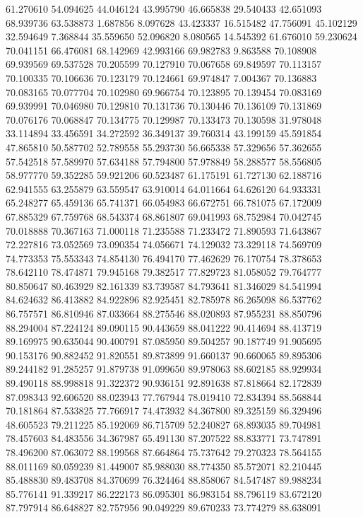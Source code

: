 61.270610
54.094625
44.046124
43.995790
46.665838
29.540433
42.651093
68.939736
63.538873
1.687856
8.097628
43.423337
16.515482
47.756091
45.102129
32.594649
7.368844
35.559650
52.096820
8.080565
14.545392
61.676010
59.230624
70.041151
66.476081
68.142969
42.993166
69.982783
9.863588
70.108908
69.939569
69.537528
70.205599
70.127910
70.067658
69.849597
70.113157
70.100335
70.106636
70.123179
70.124661
69.974847
7.004367
70.136883
70.083165
70.077704
70.102980
69.966754
70.123895
70.139454
70.083169
69.939991
70.046980
70.129810
70.131736
70.130446
70.136109
70.131869
70.076176
70.068847
70.134775
70.129987
70.133473
70.130598
31.978048
33.114894
33.456591
34.272592
36.349137
39.760314
43.199159
45.591854
47.865810
50.587702
52.789558
55.293730
56.665338
57.329656
57.362655
57.542518
57.589970
57.634188
57.794800
57.978849
58.288577
58.556805
58.977770
59.352285
59.921206
60.523487
61.175191
61.727130
62.188716
62.941555
63.255879
63.559547
63.910014
64.011664
64.626120
64.933331
65.248277
65.459136
65.741371
66.054983
66.672751
66.781075
67.172009
67.885329
67.759768
68.543374
68.861807
69.041993
68.752984
70.042745
70.018888
70.367163
71.000118
71.235588
71.233472
71.890593
71.643867
72.227816
73.052569
73.090354
74.056671
74.129032
73.329118
74.569709
74.773353
75.553343
74.854130
76.494170
77.462629
76.170754
78.378653
78.642110
78.474871
79.945168
79.382517
77.829723
81.058052
79.764777
80.850647
80.463929
82.161339
83.739587
84.793641
81.346029
84.541994
84.624632
86.413882
84.922896
82.925451
82.785978
86.265098
86.537762
86.757571
86.810946
87.033664
88.275546
88.020893
87.955231
88.850796
88.294004
87.224124
89.090115
90.443659
88.041222
90.414694
88.413719
89.169975
90.635044
90.400791
87.085950
89.504257
90.187749
91.905695
90.153176
90.882452
91.820551
89.873899
91.660137
90.660065
89.895306
89.244182
91.285257
91.879738
91.099650
89.978063
88.602185
88.929934
89.490118
88.998818
91.322372
90.936151
92.891638
87.818664
82.172839
87.098343
92.606520
88.023943
77.767944
78.019410
72.834394
88.568844
70.181864
87.533825
77.766917
74.473932
84.367800
89.325159
86.329496
48.605523
79.211225
85.192069
86.715709
52.240827
68.893035
89.704981
78.457603
84.483556
34.367987
65.491130
87.207522
88.833771
73.747891
78.496200
87.063072
88.199568
87.664864
75.737642
79.270323
78.564155
88.011169
80.059239
81.449007
85.988030
88.774350
85.572071
82.210445
85.488830
89.483708
84.370699
76.324464
88.858067
84.547487
89.988234
85.776141
91.339217
86.222173
86.095301
86.983154
88.796119
83.672120
87.797914
86.648827
82.757956
90.049229
89.670233
73.774279
88.638091

